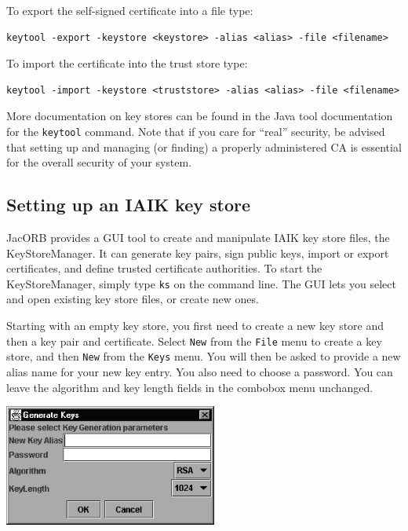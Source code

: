 To export the self-signed certificate into a file type:
\begin{verbatim}
keytool -export -keystore <keystore> -alias <alias> -file <filename>
\end{verbatim}
To import the certificate into the trust store type:
\begin{verbatim}
keytool -import -keystore <truststore> -alias <alias> -file <filename>
\end{verbatim}

More documentation on key stores  can be found in the Java tool
documentation for the {\tt keytool}  command. Note that if you care
for ``real'' security,  be advised  that setting  up  and managing
(or finding)  a properly administered CA is essential for the overall
security of your system.


\subsection{Setting up an IAIK key store}

JacORB provides a  GUI tool to create and  manipulate IAIK key store
files, the  KeyStoreManager. It  can generate  key pairs,  sign
public keys, import  or   export  certificates,  and   define  trusted
certificate authorities. To start the KeyStoreManager, simply type
{\tt ks} on the command  line. The GUI  lets you  select and  open
existing  key store files, or create new ones.

Starting with an  empty key store, you first need to  create a new key
store and then  a key pair and certificate. Select  {\tt New} from the
{\tt File}  menu to create  a key store,  and then {\tt New}  from the
{\tt Keys} menu.   You will then be asked to provide  a new alias name
for your  new key entry. You also  need to choose a  password. You can
leave  the  algorithm  and  key  length fields  in  the  combobox  menu
unchanged.

\bigskip
\begin{center}
  \includegraphics[width=7cm]{SSL/Generate}
\end{center}

